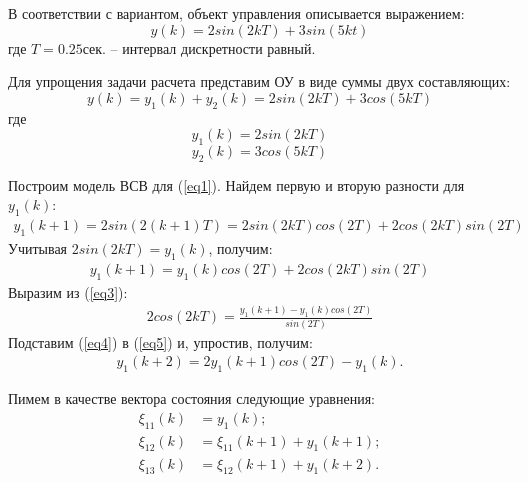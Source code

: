\documentclass[a4paper,14pt]{extreport}
\begin{document}
В соответствии с вариантом, объект управления описывается выражением:
\begin{equation}
	y(k) = 2 sin(2kT) + 3 sin(5kt)
\end{equation}
где $T = 0.25 сек.$ -- интервал дискретности равный.
	
Для упрощения задачи расчета представим ОУ в виде суммы двух составляющих:
\begin{equation}
y(k) = y_1(k) + y_2(k) = 2 sin(2kT) + 3 cos(5kT)
\end{equation}
где 
\begin{equation}\label{eq1}
y_1(k) = 2 sin(2kT)
\end{equation}
\begin{equation}\label{eq2}
y_2(k) = 3 cos(5kT)
\end{equation}

Построим модель ВСВ для (\ref{eq1}).
Найдем первую и вторую разности для $y_1(k)$:
\begin{align}\label{eq3}
y_1(k+1) = 2 sin(2 (k +1) T) = 2 sin (2kT) cos (2T) + 2 cos(2kT) sin(2T)
\end{align}
Учитывая $2 sin(2 k T) = y_1(k)$, получим:
\begin{align}\label{eq5}
y_1(k+1) = y_1(k) cos (2T) + 2 cos(2kT) sin(2T)
\end{align}
Выразим из (\ref{eq3}):
\begin{align}\label{eq4}
2 cos(2 k T) = \frac{y_1(k+1) - y_1(k) cos(2 T)}{sin(2 T)}
\end{align}
Подставим (\ref{eq4}) в (\ref{eq5}) и, упростив, получим:
\begin{align}
y_1(k+2) = 2 y_1(k+1) cos(2 T) - y_1(k).
\end{align}

Пимем в качестве вектора состояния следующие уравнения:
\begin{align}
\xi_{11}(k) &= y_1(k);\\
\xi_{12}(k) &= \xi_{11}(k+1) + y_1(k+1);\\
\xi_{13}(k) &= \xi_{12}(k+1) + y_1(k+2).
\end{align}
\end{document}
